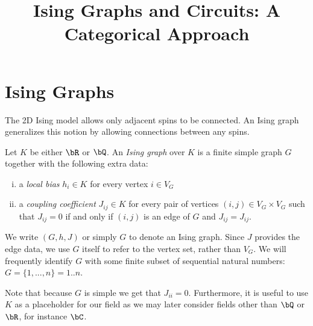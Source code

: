 
\usepackage{indentfirst}

\title{Ising Graphs and Circuits: A Categorical Approach}
\date{}

\usepackage{titling}
\renewcommand\maketitlehooka{\null\mbox{}\vfill}
\renewcommand\maketitlehookd{\vfill\null}

\setcounter{page}{1}
\maketitle

\newpage

\tableofcontents

\newpage
\section{Ising Graphs}
The 2D Ising model allows only adjacent spins to be connected. An Ising graph generalizes this notion by allowing connections between any spins.
\begin{defn}\label{defn:ising-graph}
	Let $K$ be either $\bR$ or $\bQ$. An \emph{Ising graph} over $K$ is a finite simple graph $G$ together with the following extra data:
	\begin{enumerate}[(i)]
		\item a \emph{local bias} $h_i \in K$ for every vertex $i\in V_G$
		\item a \emph{coupling coefficient} $J_{ij} \in K$ for every pair of vertices $(i,j) \in V_G \times V_G$ such that $J_{ij} = 0$ if and only if $(i,j)$ is an edge of $G$ and $J_{ij} = J_{ij}$.
	\end{enumerate}
	We write $(G,h,J)$ or simply $G$ to denote an Ising graph. Since $J$ provides the edge data, we use $G$ itself to refer to the vertex set, rather than $V_G$. We will frequently identify $G$ with some finite subset of sequential natural numbers: $G = \{1,...,n\} = 1..n$.
\end{defn}
Note that because $G$ is simple we get that $J_{ii} = 0$. Furthermore, it is useful to use $K$ as a placeholder for our field as we may later consider fields other than $\bQ$ or $\bR$, for instance $\bC$.

